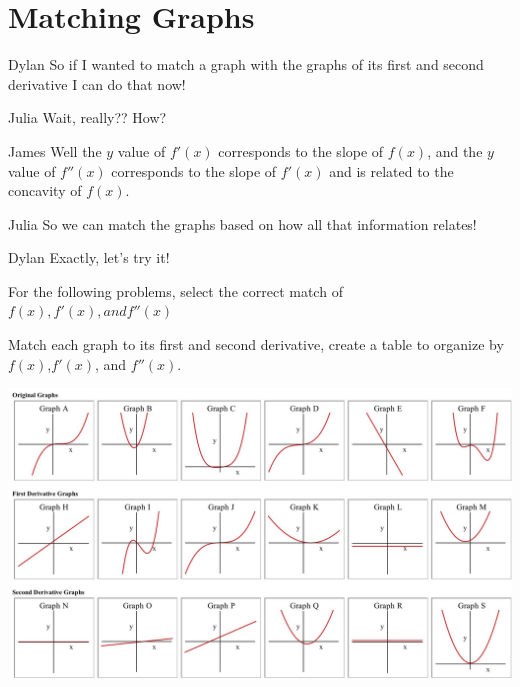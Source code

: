 \documentclass{ximera}
\begin{document}
\section{Matching Graphs}
\begin{dialogue}
\item[Dylan]So if I wanted to match a graph with the graphs of its first and second derivative I can do that now!
\item[Julia] Wait, really?? How?
\item[James] Well the $y$ value of $f'(x)$ corresponds to the slope of $f(x)$, and the $y$ value of $f''(x)$ corresponds to the slope of $f'(x)$ and is related to the concavity of $f(x)$.
\item[Julia] So we can match the graphs based on how all that information relates!
\item[Dylan] Exactly, let's try it!
\end{dialogue}
\begin{question}
For the following problems, select the correct match of $f(x),f'(x), and f''(x)$
\begin{multipleChoice}
\end{multipleChoice}
\end{question}
Match each graph to its first and second derivative, create a table to organize by $f(x)$,$f'(x)$, and $f''(x)$.

\begin{image}
\centering
\includegraphics{matching}
\end{image}
\end{document}
